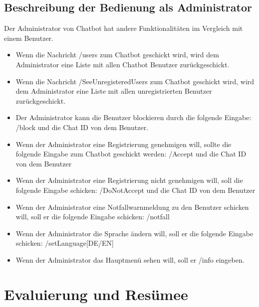 \subsection{Beschreibung der Bedienung als Administrator}
Der Administrator von Chatbot hat andere Funktionalitäten im Vergleich mit einem Benutzer. 
\begin{itemize}
	\item Wenn die Nachricht /users zum Chatbot geschickt wird, wird dem Administrator eine Liste mit allen Chatbot Benutzer zurückgeschickt.
\end{itemize}
\begin{itemize}
	\item Wenn die Nachricht /SeeUnregisteredUsers zum Chatbot geschickt wird, wird dem Administrator eine Liste mit allen unregistrierten Benutzer zurückgeschickt.
\end{itemize}
\begin{itemize}
	\item Der Administrator kann die Benutzer blockieren durch die folgende Eingabe: /block und die Chat ID von dem Benutzer. 
\end{itemize}
\begin{itemize}
	\item Wenn der Administrator eine Registrierung genehmigen will, sollte die folgende Eingabe zum Chatbot geschickt werden: /Accept und die Chat ID von dem Benutzer
\end{itemize}
\begin{itemize}
	\item Wenn der Administrator eine Registrierung nicht genehmigen will, soll die folgende Eingabe schicken: /DoNotAccept und die Chat ID von dem Benutzer
\end{itemize}
\begin{itemize}
	\item Wenn der Administrator eine Notfallwarnmeldung zu den Benutzer schicken will, soll er die folgende Eingabe schicken: /notfall
\end{itemize}
\begin{itemize}
	\item Wenn der Administrator die Sprache \"andern will, soll er die folgende Eingabe schicken: /setLanguage[DE/EN]
\end{itemize}
\begin{itemize}
	\item Wenn der Administrator das Hauptmen\"u sehen will, soll er /info eingeben.
\end{itemize}
\section{Evaluierung und Resümee}
